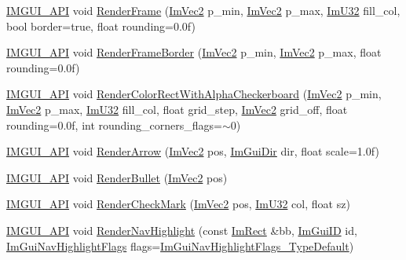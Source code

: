 \begin{DoxyCompactItemize}
\item 
\mbox{\hyperlink{imgui_8h_a43829975e84e45d1149597467a14bbf5}{I\+M\+G\+U\+I\+\_\+\+A\+PI}} void \mbox{\hyperlink{namespace_im_gui_a621ba649568ede3939d4f10d83b86d04}{Render\+Frame}} (\mbox{\hyperlink{struct_im_vec2}{Im\+Vec2}} p\+\_\+min, \mbox{\hyperlink{struct_im_vec2}{Im\+Vec2}} p\+\_\+max, \mbox{\hyperlink{imgui_8h_a118cff4eeb8d00e7d07ce3d6460eed36}{Im\+U32}} fill\+\_\+col, bool border=true, float rounding=0.\+0f)
\item 
\mbox{\hyperlink{imgui_8h_a43829975e84e45d1149597467a14bbf5}{I\+M\+G\+U\+I\+\_\+\+A\+PI}} void \mbox{\hyperlink{namespace_im_gui_adc76239c2006e66f8dab7638529a763d}{Render\+Frame\+Border}} (\mbox{\hyperlink{struct_im_vec2}{Im\+Vec2}} p\+\_\+min, \mbox{\hyperlink{struct_im_vec2}{Im\+Vec2}} p\+\_\+max, float rounding=0.\+0f)
\item 
\mbox{\hyperlink{imgui_8h_a43829975e84e45d1149597467a14bbf5}{I\+M\+G\+U\+I\+\_\+\+A\+PI}} void \mbox{\hyperlink{namespace_im_gui_a4715686ee0c613e8518c0f5e92c358ce}{Render\+Color\+Rect\+With\+Alpha\+Checkerboard}} (\mbox{\hyperlink{struct_im_vec2}{Im\+Vec2}} p\+\_\+min, \mbox{\hyperlink{struct_im_vec2}{Im\+Vec2}} p\+\_\+max, \mbox{\hyperlink{imgui_8h_a118cff4eeb8d00e7d07ce3d6460eed36}{Im\+U32}} fill\+\_\+col, float grid\+\_\+step, \mbox{\hyperlink{struct_im_vec2}{Im\+Vec2}} grid\+\_\+off, float rounding=0.\+0f, int rounding\+\_\+corners\+\_\+flags=$\sim$0)
\item 
\mbox{\hyperlink{imgui_8h_a43829975e84e45d1149597467a14bbf5}{I\+M\+G\+U\+I\+\_\+\+A\+PI}} void \mbox{\hyperlink{namespace_im_gui_a23383180b2870fa1326f5c5394fc03d7}{Render\+Arrow}} (\mbox{\hyperlink{struct_im_vec2}{Im\+Vec2}} pos, \mbox{\hyperlink{imgui_8h_a874086389bc27cc9647118d22a806403}{Im\+Gui\+Dir}} dir, float scale=1.\+0f)
\item 
\mbox{\hyperlink{imgui_8h_a43829975e84e45d1149597467a14bbf5}{I\+M\+G\+U\+I\+\_\+\+A\+PI}} void \mbox{\hyperlink{namespace_im_gui_a2d0e4160081b3953fc8f88e2d8e8da15}{Render\+Bullet}} (\mbox{\hyperlink{struct_im_vec2}{Im\+Vec2}} pos)
\item 
\mbox{\hyperlink{imgui_8h_a43829975e84e45d1149597467a14bbf5}{I\+M\+G\+U\+I\+\_\+\+A\+PI}} void \mbox{\hyperlink{namespace_im_gui_a6adfc430445ed42a65556ffb0d58a8b8}{Render\+Check\+Mark}} (\mbox{\hyperlink{struct_im_vec2}{Im\+Vec2}} pos, \mbox{\hyperlink{imgui_8h_a118cff4eeb8d00e7d07ce3d6460eed36}{Im\+U32}} col, float sz)
\item 
\mbox{\hyperlink{imgui_8h_a43829975e84e45d1149597467a14bbf5}{I\+M\+G\+U\+I\+\_\+\+A\+PI}} void \mbox{\hyperlink{namespace_im_gui_afc84af0481214603f058b6ee31d20855}{Render\+Nav\+Highlight}} (const \mbox{\hyperlink{struct_im_rect}{Im\+Rect}} \&bb, \mbox{\hyperlink{imgui_8h_a1785c9b6f4e16406764a85f32582236f}{Im\+Gui\+ID}} id, \mbox{\hyperlink{imgui__internal_8h_a8c2855ba575756109c607c10697bcccd}{Im\+Gui\+Nav\+Highlight\+Flags}} flags=\mbox{\hyperlink{imgui__internal_8h_a55ae92b6fb7a0edbe4814f6e261d9e26ae54860a6f56817772ef7f1f42ca3c1bd}{Im\+Gui\+Nav\+Highlight\+Flags\+\_\+\+Type\+Default}})

\end{DoxyCompactItemize}
